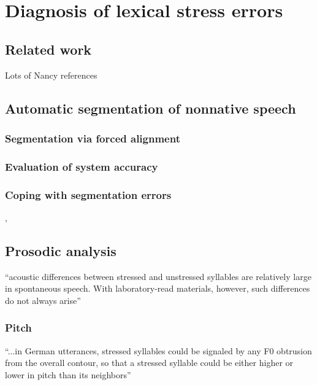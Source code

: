 %
%
\chapter{Diagnosis of lexical stress errors}
\label{chap:diagnosis}



\section{Related work}

	Lots of Nancy references
	
	\cite{Duong2011}
	
	\cite{Probst2002}

\section{Automatic segmentation of nonnative speech}
	\subsection{Segmentation via forced alignment}
	\subsection{Evaluation of system accuracy}
	\subsection{Coping with segmentation errors}
		\cite{Mesbahi2011},
		\cite{Orosanu2012}
	
\section{Prosodic analysis}
	``acoustic differences between stressed and unstressed syllables are relatively large in spontaneous speech. With laboratory-read materials, however, such differences do not always arise'' \citep[p.~275]{Cutler2005}

	\subsection{Pitch}
		``...in German utterances, stressed syllables could be signaled by any F0 obtrusion from the overall contour, so that a stressed syllable could be either higher or lower in pitch than its neighbors'' \citep[p.~267]{Cutler2005}
